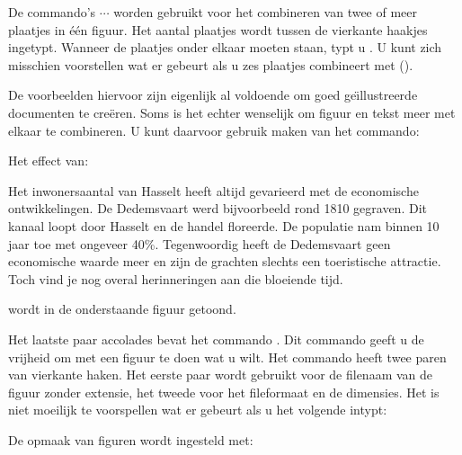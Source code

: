 
De commando's \type{\startcombinatie} $\cdots$
\type{\stopcombinatie} worden gebruikt voor het combineren
van twee of meer plaatjes in \'e\'en figuur. Het aantal
plaatjes wordt tussen de vierkante haakjes ingetypt. Wanneer
de plaatjes onder elkaar moeten staan, typt u \type{[1*2]}.
U kunt zich misschien voorstellen wat er gebeurt als u zes
plaatjes combineert met \type{[3*2]}
().

De voorbeelden hiervoor zijn eigenlijk al voldoende om goed
ge\"{\i}llustreerde documenten te cre\"eren. Soms is het echter
wenselijk om figuur en tekst meer met elkaar te combineren.
U kunt daarvoor gebruik maken van het commando:


Het effect van:

\startbuffer
{}
  {\externfiguur[ma-cb-18][breedte=.5\zetbreedte]}
  Het inwonersaantal van Hasselt heeft altijd
  gevarieerd met de economische ontwikkelingen. De
  Dedemsvaart werd bijvoorbeeld rond 1810 gegraven. Dit
  kanaal loopt door Hasselt en de handel floreerde. De
  populatie nam binnen 10 jaar toe met ongeveer 40\%.
  Tegenwoordig heeft de Dedemsvaart geen economische waarde
  meer en zijn de grachten slechts een toeristische
  attractie. Toch vind je nog overal herinneringen aan die
  bloeiende tijd.
\stopfiguurtekst
\stopbuffer

\typebuffer

wordt in de onderstaande figuur getoond.

\start
\steltolerantiein[zeersoepel]
\haalbuffer
\stop


Het laatste paar accolades bevat het commando
\type{\externfiguur}. Dit commando geeft u de vrijheid om
met een figuur te doen wat u wilt. Het commando
\type{\externfiguur} heeft twee paren van vierkante haken.
Het eerste paar wordt gebruikt voor de filenaam van de
figuur zonder extensie, het tweede voor het fileformaat en
de dimensies. Het is niet moeilijk te voorspellen wat er
gebeurt als u het volgende intypt:

\startbuffer[margefiguur]
\inmarge
  {\externfiguur
     [ma-cb-23]
     [breedte=\margebreedte]}
\stopbuffer

\typebuffer[margefiguur]

De opmaak van figuren wordt ingesteld met:


